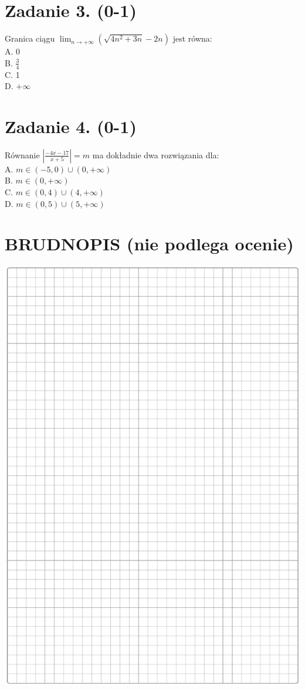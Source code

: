 \documentclass[10pt]{article}
\begin{document}
\section*{Zadanie 3. (0-1)}
Granica ciągu \(\lim _{n \rightarrow+\infty}\left(\sqrt{4 n^{2}+3 n}-2 n\right)\) jest równa:\\
A. 0\\
B. \(\frac{3}{4}\)\\
C. 1\\
D. \(+\infty\)

\section*{Zadanie 4. (0-1)}
Równanie \(\left|\frac{-4 x-17}{x+5}\right|=m\) ma dokładnie dwa rozwiązania dla:\\
A. \(m \in(-5,0) \cup(0,+\infty)\)\\
B. \(m \in(0,+\infty)\)\\
C. \(m \in(0,4) \cup(4,+\infty)\)\\
D. \(m \in(0,5) \cup(5,+\infty)\)

\section*{BRUDNOPIS (nie podlega ocenie)}
\begin{center}
\includegraphics[max width=\textwidth]{2024_11_21_599d917d55a506aace4bg-03}
\end{center}
\end{document}
